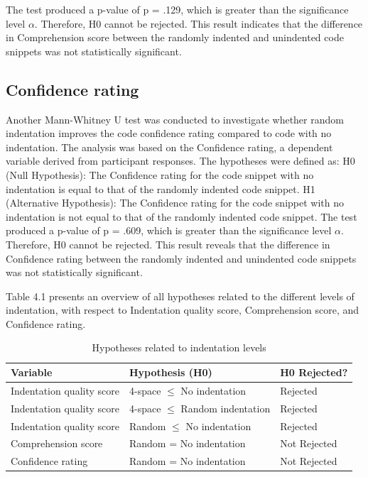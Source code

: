 The test produced a p-value of p = .129, which is greater than the significance level \(\alpha\). Therefore, H0 cannot be rejected. This result indicates that the difference in Comprehension score between the randomly indented and unindented code snippets was not statistically significant.


\subsection{Confidence rating}

Another Mann-Whitney U test was conducted to investigate whether random indentation improves the code confidence rating compared to code with no indentation. The analysis was based on the Confidence rating, a dependent variable derived from participant responses. The hypotheses were defined as: H0 (Null Hypothesis): The Confidence rating for the code snippet with no indentation is equal to that of the randomly indented code snippet. H1 (Alternative Hypothesis): The Confidence rating for the code snippet with no indentation is not equal to that of the randomly indented code snippet.
The test produced a p-value of p = .609, which is greater than the significance level \(\alpha\). Therefore, H0 cannot be rejected. This result reveals that the difference in Confidence rating between the randomly indented and unindented code snippets was not statistically significant.  



Table 4.1 presents an overview of all hypotheses related to the different levels of indentation, with respect to Indentation quality score, Comprehension score, and Confidence rating.

\begin{table}[ht]
\centering
\small
\begin{tabular}{|p{5cm}|p{6cm}|p{2.5cm}|}
\hline
\rule{0pt}{1.2em}\textbf{Variable} & \textbf{Hypothesis (H0)} & \textbf{H0 Rejected?} \\[0.5em]
\hline
\rule{0pt}{1.2em}Indentation quality score & 4-space $\leq$ No indentation & Rejected \\[0.5em]
\hline
\rule{0pt}{1.2em}Indentation quality score & 4-space $\leq$ Random indentation & Rejected \\[0.5em]
\hline
\rule{0pt}{1.2em}Indentation quality score & Random $\leq$ No indentation & Rejected \\[0.5em]
\hline
\rule{0pt}{1.2em}Comprehension score & Random = No indentation & Not Rejected \\[0.5em]
\hline
\rule{0pt}{1.2em}Confidence rating & Random = No indentation & Not Rejected \\[0.5em]
\hline
\end{tabular}
\caption{Hypotheses related to indentation levels}
\end{table}


